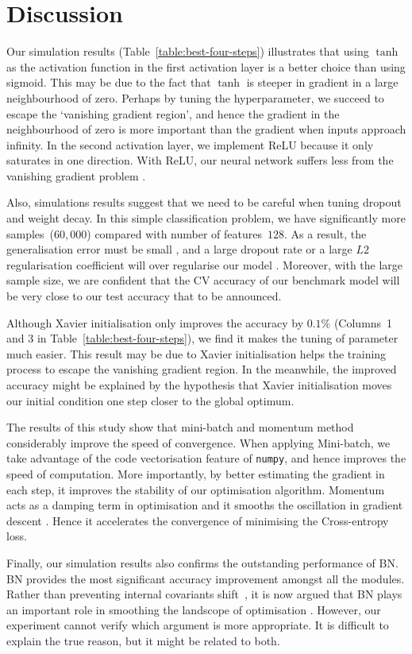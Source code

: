 \section{Discussion}

Our simulation results (Table~\ref{table:best-four-steps}) illustrates that using $\tanh$ as the activation function in the first activation layer is a better choice than using sigmoid. This may be due to the fact that $\tanh$ is steeper in gradient in a large neighbourhood of zero. Perhaps by tuning the hyperparameter, we succeed to escape the `vanishing gradient region', and hence the gradient in the neighbourhood of zero is more important than the gradient when inputs approach infinity. In the second activation layer, we implement ReLU because it only saturates in one direction. With ReLU, our neural network suffers less from the vanishing gradient problem \citep{pmlr-v9-glorot10a}.

Also, simulations results suggest that we need to be careful when tuning dropout and weight decay. In this simple classification problem, we have significantly more samples~($60,000$) compared with number of  features~$128$. As a result, the generalisation error must be small \citep{james2013introduction}, and a large dropout rate or a large $L2$ regularisation coefficient will over regularise our model \citep{hastie01statisticallearning}. Moreover, with the large sample size, we are confident that the CV accuracy of our benchmark model will be very close to our test accuracy that to be announced.

Although Xavier initialisation only improves the accuracy by $0.1\%$ (Columns~1 and 3 in Table~\ref{table:best-four-steps}), we find it makes the tuning of parameter much easier. This result may be due to Xavier initialisation helps the training process to escape the vanishing gradient region. In the meanwhile, the improved accuracy might be explained by the hypothesis that Xavier initialisation moves our initial condition one step closer to the global optimum.

The results of this study show that mini-batch and momentum method considerably improve the speed of convergence. When applying Mini-batch, we take advantage of the code vectorisation feature of \texttt{numpy}, and hence improves the speed of computation. More importantly, by better estimating the gradient in each step, it improves the stability of our optimisation algorithm. Momentum acts as a damping term in optimisation and it smooths the oscillation in gradient descent \citep{goh2017why}. Hence it accelerates the convergence of minimising the Cross-entropy loss.

Finally, our simulation results also confirms the outstanding performance of BN. BN provides the most significant accuracy improvement amongst all the modules. Rather than preventing internal covariants shift~\citep{pmlr-v37-ioffe15}, it is now argued that BN plays an important role in smoothing the landscope of optimisation \citep{NIPS20187515}. However, our experiment cannot verify which argument is more appropriate. It is difficult to explain the true reason, but it might be related to both.